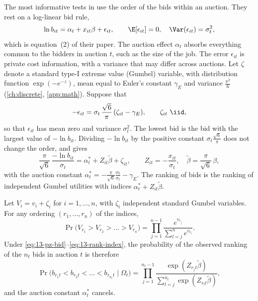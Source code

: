 The most informative tests in \citet{PorterZona1993} use the order of the bids within an auction. They rest on a
log-linear bid rule,
\begin{equation}\label{eq:13-pz-bid}
  \ln b_{it} = \alpha_t + x_{it}\beta + \epsilon_{it}, \qquad \E[\epsilon_{it}] = 0,\quad \Var(\epsilon_{it}) = \sigma_t^2 ,
\end{equation}
which is equation~(2) of their paper. The auction effect $\alpha_t$ absorbs everything common to the bidders in
auction $t$, such as the size of the job. The error $\epsilon_{it}$ is private cost information, with a variance
that may differ across auctions. Let $\zeta$ denote a standard type-I extreme value (Gumbel) variable, with
distribution function $\exp(-e^{-z})$, mean equal to Euler's constant $\gamma_E$ and variance $\frac{\pi^2}{6}$
(\cref{ch:discrete}, \cref{app:math}). Suppose that
\begin{equation}\label{eq:13-gumbel-error}
  -\epsilon_{it} = \sigma_t\,\frac{\sqrt{6}}{\pi}\,(\zeta_{it} - \gamma_E), \qquad \zeta_{it}\ \iid ,
\end{equation}
so that $\epsilon_{it}$ has mean zero and variance $\sigma_t^2$. The lowest bid is the bid with the largest value of
$-\ln b_{it}$. Dividing $-\ln b_{it}$ by the positive constant $\sigma_t\frac{\sqrt6}{\pi}$ does not change the
order, and gives
\begin{equation}\label{eq:13-rank-index}
  \frac{\pi}{\sqrt{6}}\,\frac{-\ln b_{it}}{\sigma_t} = \alpha^{*}_t + Z_{it}\tilde\beta + \zeta_{it},
  \qquad Z_{it} = -\frac{x_{it}}{\sigma_t},\quad \tilde\beta = \frac{\pi}{\sqrt6}\,\beta ,
\end{equation}
with the auction constant $\alpha^{*}_t = -\frac{\pi}{\sqrt6}\frac{\alpha_t}{\sigma_t} - \gamma_E$. The ranking of bids
is the ranking of independent Gumbel utilities with indices $\alpha^{*}_t + Z_{it}\tilde\beta$.

\begin{proposition}\label{prop:13-exploded-logit}
Let $V_i = v_i + \zeta_i$ for $i = 1, \dots, n$, with $\zeta_i$ independent standard Gumbel variables. For any
ordering $(r_1, \dots, r_n)$ of the indices,
\begin{equation}\label{eq:13-exploded}
  \Pr\bigl(V_{r_1} > V_{r_2} > \dots > V_{r_n}\bigr) = \prod_{j=1}^{n-1}\frac{e^{v_{r_j}}}{\sum_{l=j}^{n}e^{v_{r_l}}} .
\end{equation}
Under \eqref{eq:13-pz-bid}--\eqref{eq:13-rank-index}, the probability of the observed ranking of the $n_t$ bids in
auction $t$ is therefore
\begin{equation}\label{eq:13-rank-likelihood}
  \Pr\bigl(b_{r_1 t} < b_{r_2 t} < \dots < b_{r_{n_t} t} \mid \Omega_t\bigr)
  = \prod_{j=1}^{n_t - 1}\frac{\exp(Z_{r_j t}\tilde\beta)}{\sum_{l=j}^{n_t}\exp(Z_{r_l t}\tilde\beta)} ,
\end{equation}
and the auction constant $\alpha^{*}_t$ cancels.
\end{proposition}

